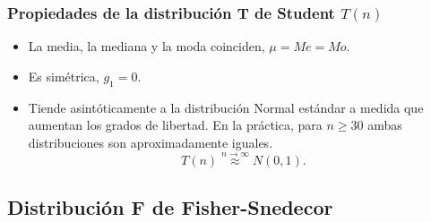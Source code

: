 \begin{frame}
\frametitle{Propiedades de la distribución T de Student $T(n)$}
\begin{itemize}
\item La media, la mediana y la moda coinciden, $\mu=Me=Mo$.
\item Es simétrica, $g_1=0$.
\item Tiende asintóticamente a la distribución Normal estándar a medida que aumentan los grados de libertad.
En la práctica, para $n\geq 30$ ambas distribuciones son aproximadamente iguales.
\[
T(n)\stackrel{n\rightarrow \infty}{\approx}N(0,1).
\]
\end{itemize}

\end{frame}


\subsection{Distribución F de Fisher-Snedecor}

